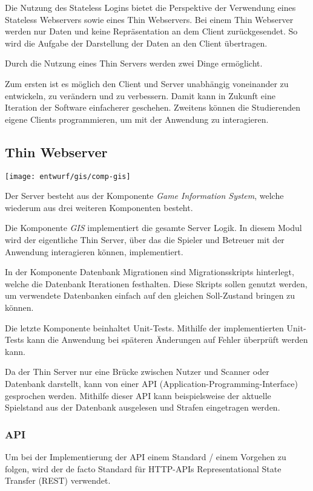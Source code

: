 Die Nutzung des Stateless Logins bietet die Perspektive der Verwendung eines Stateless Webservers sowie eines Thin Webservers. Bei einem Thin Webserver werden nur Daten und keine Repräsentation an dem Client zurückgesendet. So wird die Aufgabe der Darstellung der Daten an den Client übertragen.

Durch die Nutzung eines Thin Servers werden zwei Dinge ermöglicht. 

Zum ersten ist es möglich den Client und Server unabhängig voneinander zu entwickeln, zu verändern und zu verbessern. Damit kann in Zukunft eine Iteration der Software einfacherer geschehen. Zweitens können die Studierenden eigene Clients programmieren, um mit der Anwendung zu interagieren.

\subsection{Thin Webserver}
\begin{center}
	\texttt{[image: entwurf/gis/comp-gis]}
\end{center}

Der Server besteht aus der Komponente \textit{Game Information System}, welche wiederum aus drei weiteren Komponenten besteht. 

Die Komponente \textit{GIS} implementiert die gesamte Server Logik. In diesem Modul wird der eigentliche Thin Server, über das die Spieler und Betreuer mit der Anwendung interagieren können, implementiert.

In der Komponente Datenbank Migrationen sind Migrationsskripts hinterlegt, welche die Datenbank Iterationen festhalten. Diese Skripts sollen genutzt werden, um verwendete Datenbanken einfach auf den gleichen Soll-Zustand bringen zu können. 

Die letzte Komponente beinhaltet Unit-Tests. Mithilfe der implementierten Unit-Tests kann die Anwendung bei späteren Änderungen auf Fehler überprüft werden kann.


Da der Thin Server nur eine Brücke zwischen Nutzer und Scanner oder Datenbank darstellt, kann von einer API (Application-Programming-Interface) gesprochen werden. Mithilfe dieser API kann beispielsweise der aktuelle Spielstand aus der Datenbank ausgelesen und Strafen eingetragen werden.

\subsubsection{API}
Um bei der Implementierung der API einem Standard / einem Vorgehen zu folgen, wird der de facto Standard für HTTP-APIs Representational State Transfer (REST) verwendet.

